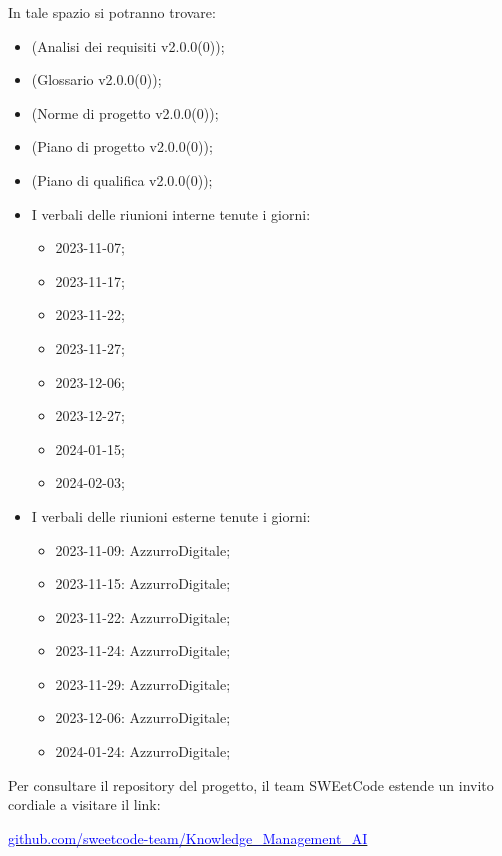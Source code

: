 \documentclass[10pt, a4paper]{article}
\begin{document}
In tale spazio si potranno trovare:
\begin{itemize}
    \item (Analisi dei requisiti v2.0.0(0));
    \item (Glossario v2.0.0(0));
    \item (Norme di progetto v2.0.0(0));
    \item (Piano di progetto v2.0.0(0));
    \item (Piano di qualifica v2.0.0(0));
    \item I verbali delle riunioni interne tenute i giorni:
        \begin{itemize}
            \item 2023-11-07;
            \item 2023-11-17;
            \item 2023-11-22;
            \item 2023-11-27;
            \item 2023-12-06;
            \item 2023-12-27;
            \item 2024-01-15;
            \item 2024-02-03;
        \end{itemize}
   \item I verbali delle riunioni esterne tenute i giorni:
        \begin{itemize}
            \item 2023-11-09: AzzurroDigitale;
            \item 2023-11-15: AzzurroDigitale;
            \item 2023-11-22: AzzurroDigitale;
            \item 2023-11-24: AzzurroDigitale;
            \item 2023-11-29: AzzurroDigitale;
            \item 2023-12-06: AzzurroDigitale;
            \item 2024-01-24: AzzurroDigitale;
        \end{itemize}    
\end{itemize}

Per consultare il repository del progetto, il team SWEetCode estende un invito cordiale a visitare il link:\\
\begin{center}
\href{https://github.com/sweetcode-team/Knowledge_Management_AI}{\textcolor{blue}{github.com/sweetcode-team/Knowledge\_Management\_AI}}
\end{center}
\end{document}
